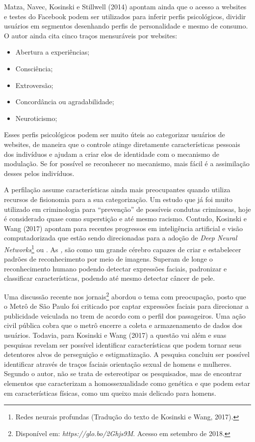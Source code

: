 Matza, Navec, Kosinski e Stillwell (2014) apontam ainda que o acesso a
websites e testes do Facebook podem ser utilizados para inferir perfis
psicológicos, dividir usuários em segmentos desenhando perfis de
personalidade e mesmo de consumo. O autor ainda cita cinco traços
mensuráveis por websites:

\begin{itemize}
\item
  Abertura a experiências;
\item
  Consciência;
\item
  Extroversão;
\item
  Concordância ou agradabilidade;
\item
  Neuroticismo;
\end{itemize}

Esses perfis psicológicos podem ser muito úteis ao categorizar usuários
de websites, de maneira que o controle atinge diretamente
características pessoais dos indivíduos e ajudam a criar elos de
identidade com o mecanismo de modulação. Se for possível se reconhecer
no mecanismo, mais fácil é a assimilação desses pelos indivíduos.

A perfilação assume características ainda mais preocupantes quando
utiliza recursos de fisionomia para a sua categorização. Um estudo que
já foi muito utilizado em criminologia para ``prevenção'' de possíveis
condutas criminosas, hoje é considerado quase como superstição e até
mesmo racismo. Contudo, Kosinski e Wang (2017) apontam para recentes
progressos em inteligência artificial e visão computadorizada que estão
sendo direcionadas para a adoção de \emph{Deep Neural
Networks}\footnote{Redes neurais profundas (Tradução do texto de
  Kosinski e Wang, 2017).} ou \emph{}. As \emph{,} são como um
grande cérebro capazes de criar e estabelecer padrões de reconhecimento
por meio de imagens. Superam de longe o reconhecimento humano podendo
detectar expressões faciais, padronizar e classificar características,
podendo até mesmo detectar câncer de pele.

Uma discussão recente nos jornais\footnote{Disponível em:
\emph{https://glo.bo/2Ghjs9M}. Acesso em setembro de 2018.} abordou o tema com preocupação, posto que
o Metrô de São Paulo foi criticado por captar expressões faciais para
direcionar a publicidade veiculada no trem de acordo com o perfil dos
passageiros. Uma ação civil pública cobra que o metrô encerre a coleta e
armazenamento de dados dos usuários. Todavia, para Kosinski e Wang (2017)
a questão vai além e suas pesquisas revelam ser possível identificar
características que podem tornar seus detentores alvos de perseguição e
estigmatização. A pesquisa concluiu ser possível identificar através de
traços faciais orientação sexual de homens e mulheres. Segundo o autor,
não se trata de estereotipar os pesquisados, mas de encontrar elementos
que caracterizam a homossexualidade como genética e que podem estar em
características físicas, como um queixo mais delicado para homens.

